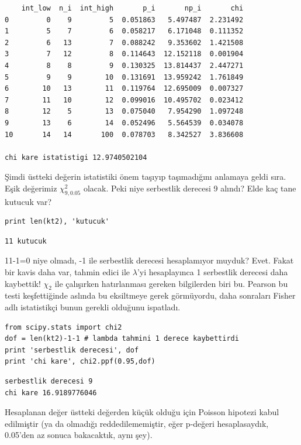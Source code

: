 \documentclass[12pt,fleqn]{article}\usepackage{../../common}
\begin{document}
\begin{verbatim}
    int_low  n_i  int_high       p_i       np_i       chi
0         0    9         5  0.051863   5.497487  2.231492
1         5    7         6  0.058217   6.171048  0.111352
2         6   13         7  0.088242   9.353602  1.421508
3         7   12         8  0.114643  12.152118  0.001904
4         8    8         9  0.130325  13.814437  2.447271
5         9    9        10  0.131691  13.959242  1.761849
6        10   13        11  0.119764  12.695009  0.007327
7        11   10        12  0.099016  10.495702  0.023412
8        12    5        13  0.075040   7.954290  1.097248
9        13    6        14  0.052496   5.564539  0.034078
10       14   14       100  0.078703   8.342527  3.836608

chi kare istatistigi 12.9740502104
\end{verbatim}

Şimdi üstteki değerin istatistiki önem taşıyıp taşımadığını anlamaya geldi
sıra. Eşik değerimiz $\chi^2_{9,0.05}$ olacak. Peki niye serbestlik
derecesi 9 alındı? Elde kaç tane kutucuk var? 

\begin{verbatim}
print len(kt2), 'kutucuk'
\end{verbatim}

\begin{verbatim}
11 kutucuk
\end{verbatim}

11-1=0 niye olmadı, -1 ile serbestlik derecesi hesaplamıyor muyduk?
Evet. Fakat bir kavis daha var, tahmin edici ile $\lambda$'yi hesaplayınca
1 serbestlik derecesi daha kaybettik! $\chi_2$ ile çalışırken hatırlanması
gereken bilgilerden biri bu. Pearson bu testi keşfettiğinde aslında bu
eksiltmeye gerek görmüyordu, daha sonraları Fisher adlı istatistikçi bunun
gerekli olduğunu ispatladı.

\begin{verbatim}
from scipy.stats import chi2
dof = len(kt2)-1-1 # lambda tahmini 1 derece kaybettirdi
print 'serbestlik derecesi', dof
print 'chi kare', chi2.ppf(0.95,dof)
\end{verbatim}

\begin{verbatim}
serbestlik derecesi 9
chi kare 16.9189776046
\end{verbatim}

Hesaplanan değer üstteki değerden küçük olduğu için Poisson hipotezi kabul
edilmiştir (ya da olmadığı reddedilememiştir, eğer p-değeri hesaplasaydık,
0.05'den az sonuca bakacaktık, aynı şey). 
\end{document}

